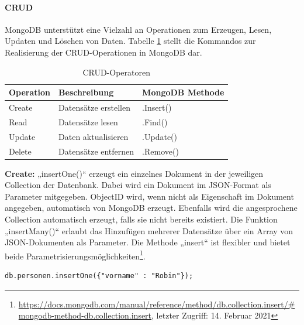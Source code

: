 \paragraph{CRUD}
MongoDB unterstützt eine Vielzahl an Operationen zum Erzeugen, Lesen, Updaten und Löschen von Daten.
Tabelle \ref{CRUDOperatoren} stellt die Kommandos zur Realisierung der CRUD-Operationen in MongoDB dar.
\newline

\begin{table}[tbt]
\caption{CRUD-Operatoren}
\label{CRUDOperatoren}
\begin{center}
    \begin{tabular}{ l  p{8cm}  l }
    \toprule
    \textbf{Operation} & \textbf{Beschreibung} & \textbf{MongoDB Methode} \\
    \midrule

    Create & Datensätze erstellen & .Insert() \\

	Read & Datensätze lesen & .Find() \\

    Update & Daten aktualisieren & .Update() \\ 

    Delete & Datensätze entfernen & .Remove()  \\ 
    \bottomrule
    \end{tabular}
\end{center}
\end{table}

\noindent
{}
\textbf{Create:}
„insertOne()“ erzeugt ein einzelnes Dokument in der jeweiligen Collection der Datenbank. Dabei wird ein Dokument im JSON-Format als Parameter mitgegeben. ObjectID wird, wenn nicht als Eigenschaft im Dokument angegeben, automatisch von MongoDB erzeugt. Ebenfalls wird die angesprochene Collection automatisch erzeugt, falls sie nicht bereits existiert. Die Funktion „insertMany()“  erlaubt das Hinzufügen mehrerer Datensätze über ein Array von JSON-Dokumenten als Parameter. Die Methode „insert“ ist flexibler und bietet beide Parametrisierungsmöglichkeiten\footnote{\url{https://docs.mongodb.com/manual/reference/method/db.collection.insert/\#mongodb-method-db.collection.insert}, letzter Zugriff: 14. Februar 2021}.
\newline
\begin{lstlisting}[caption=MongoDB Create, label=lst:MongoDBCreate]
db.personen.insertOne({"vorname" : "Robin"});
\end{lstlisting}

